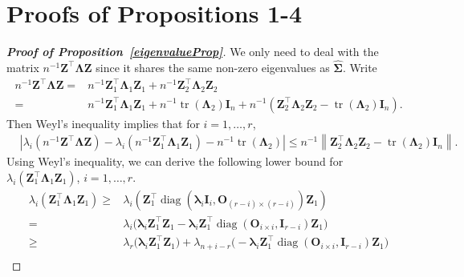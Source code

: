 \documentclass[10pt]{book}
\theoremstyle{definition}
\DeclareMathOperator{\mytr}{tr}
\DeclareMathOperator{\mydiag}{diag}
\newcommand{\bZ}{\mathbf{Z}}
\newcommand{\bO}{\mathbf{O}}
\newcommand{\bI}{\mathbf{I}}
\newcommand{\bfsym}[1]{\ensuremath{\boldsymbol{#1}}}
\def\blambda {\bfsym {\lambda}}
\def\bLambda {\bfsym {\Lambda}}
\def\bSigma {\bfsym {\Sigma}}
\begin{document}
\section{Proofs of Propositions 1-4}
\setcounter{equation}{0}

\begin{proof}[\textbf{Proof of Proposition~\ref{eigenvalueProp}}]
    We only need to deal with the matrix $n^{-1}\bZ^\top \bLambda \bZ$ since it shares the same non-zero eigenvalues as $\hat{\bSigma}$.
    Write
    \begin{equation*}
        \begin{split}
        n^{-1}\bZ^\top \bLambda \bZ=&
        n^{-1}\bZ_1^\top \bLambda_1 \bZ_1+
        n^{-1}\bZ_2^\top \bLambda_2 \bZ_2
        \\
        =&
        n^{-1}\bZ_1^\top \bLambda_1 \bZ_1+
        n^{-1}\mytr(\bLambda_2)\bI_n+
        n^{-1}\left(\bZ_2^\top \bLambda_2 \bZ_2-\mytr(\bLambda_2)\bI_n\right)
        .
        \end{split}
    \end{equation*}
    Then Weyl's inequality implies that for $ i=1,\ldots, r$,
    \begin{equation}\label{eigenBoundForF}
        \begin{split}
        &
        \left|
        \lambda_i\left(n^{-1}\bZ^\top \bLambda \bZ\right)
        -
        \lambda_i(n^{-1}\bZ_1^\top \bLambda_1 \bZ_1)
        -
        n^{-1}
        \mytr(\bLambda_2)
        \right|
        \leq
        n^{-1}\left\|\bZ_2^\top \bLambda_2 \bZ_2-
        \mytr(\bLambda_2)
        \bI_n\right\|.
        \end{split}
    \end{equation}
    Using Weyl's inequality, we can derive the following lower bound for $\lambda_i(\bZ_1^\top \bLambda_1 \bZ_1)$, $ i=1,\ldots, r$.
\begin{equation*}
\begin{aligned}
\lambda_i(\bZ_1^\top \bLambda_1 \bZ_1)
\geq&
\lambda_i(\bZ_1^\top \mydiag(\blambda_i \bI_{i},\bO_{(r-i)\times(r-i)}) \bZ_1)
\\
    =&
    \lambda_i\Big( \blambda_i \bZ_1^\top \bZ_1-\blambda_i\bZ_1^\top \mydiag(\bO_{i\times i}, \bI_{r-i}) \bZ_1\Big)\\
    \geq&
    \lambda_r\Big( \blambda_i \bZ_1^\top \bZ_1\Big)+\lambda_{n+i-r}\Big(-\blambda_i\bZ_1^\top \mydiag(\bO_{i\times i}, \bI_{r-i}) \bZ_1\Big)\\

\end{aligned}
\end{equation*}
\end{proof}
\end{document}
